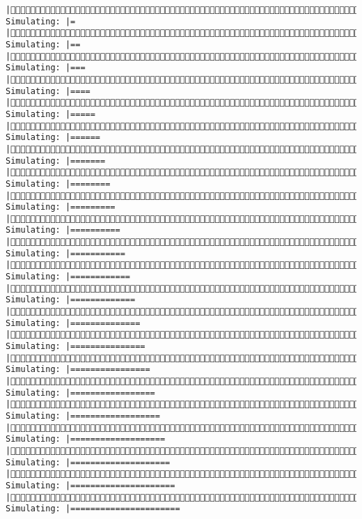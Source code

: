 \documentclass[]{article}
\begin{document}
\begin{verbatim}
|(10/10) Simulating: |=                                                    |(10/10) Simulating: |==                                                   |(10/10) Simulating: |===                                                  |(10/10) Simulating: |====                                                 |(10/10) Simulating: |=====                                                |(10/10) Simulating: |======                                               |(10/10) Simulating: |=======                                              |(10/10) Simulating: |========                                             |(10/10) Simulating: |=========                                            |(10/10) Simulating: |==========                                           |(10/10) Simulating: |===========                                          |(10/10) Simulating: |============                                         |(10/10) Simulating: |=============                                        |(10/10) Simulating: |==============                                       |(10/10) Simulating: |===============                                      |(10/10) Simulating: |================                                     |(10/10) Simulating: |=================                                    |(10/10) Simulating: |==================                                   |(10/10) Simulating: |===================                                  |(10/10) Simulating: |====================                                 |(10/10) Simulating: |=====================                                |(10/10) Simulating: |======================                               
\end{verbatim}
\end{document}
